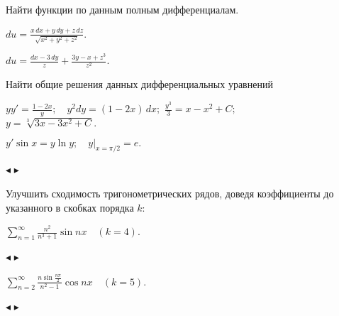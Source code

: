 \documentclass[a5paper,10pt]{article}
\begin{document}
\medskip
\noindent Найти функции по данным полным дифференциалам.

\medskip
{} $\displaystyle du=\frac{x\,dx+y\,dy+z\,dz}{\sqrt{x^2+y^2+z^2}}$.

\medskip
{} $\displaystyle du=\frac{dx-3\,dy}{z}+\frac{3y-x+z^3}{z^2}$.

\medskip
\noindent Найти общие решения данных дифференциальных уравнений

\medskip
{} $\displaystyle yy'=\frac{1-2x}{y};\quad y^2dy=(1-2x)\,dx;$
$\displaystyle \frac{y^3}{3}=x-x^2+C;$\\
$y=\sqrt[3]{3x-3x^2+C}.$

\medskip
{} $y'\sin x=y\ln y;\quad y|_{x=\pi/2}=e.$

\medskip
{}

\medskip
{}

\medskip
{}

\medskip
{}

\medskip
{}

\medskip
{}

\medskip
{}

\medskip
{}

\medskip
{}

\medskip
{}

\medskip
{}

\medskip
{}

\medskip
{}

\medskip
{}

\medskip
{}

\smallskip
\noindent $\blacktriangleleft$
$\blacktriangleright$

\medskip
Улучшить сходимость тригонометрических рядов, доведя коэффициенты
до указанного в скобках порядка $k$:

\medskip
{} $\displaystyle \sum_{n=1}^{\infty}\frac{n^2}{n^3+1}\sin nx\quad (k=4)$.

\smallskip
\noindent $\blacktriangleleft$
$\blacktriangleright$

\medskip
{} $\displaystyle \sum_{n=2}^{\infty}\frac{n \sin\frac{n\pi}{2}}{n^2-1}\cos nx\quad (k=5)$.

\smallskip
\noindent $\blacktriangleleft$
$\blacktriangleright$
\end{document}

